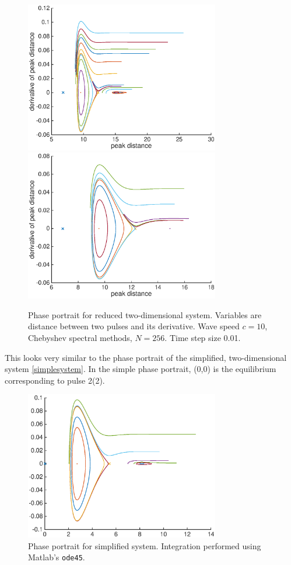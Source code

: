 \documentclass[12pt]{article}
\begin{document}
\begin{figure}[H]
	\includegraphics[width=8.5cm]{phaseportrait1}
	\includegraphics[width=8.5cm]{phaseportrait2}
	\caption{Phase portrait for reduced two-dimensional system. Variables are distance between two pulses and its derivative. Wave speed $c = 10$, Chebyshev spectral methods, $N = 256$. Time step size 0.01.}
\end{figure}

This looks very similar to the phase portrait of the simplified, two-dimensional system \eqref{simplesystem}. In the simple phase portrait, (0,0) is the equilibrium corresponding to pulse 2(2). 

\begin{figure}[H]
	\includegraphics[width=8.5cm]{simplephaseportrait}
	\caption{Phase portrait for simplified system. Integration performed using Matlab's \texttt{ode45}.}
\end{figure}
\end{document}
